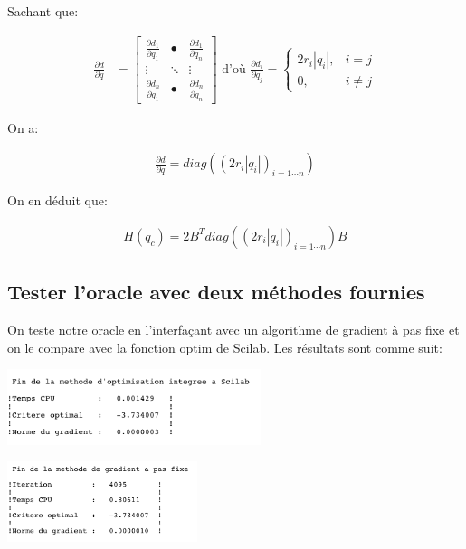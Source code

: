 Sachant que:

\vspace{-1.5em}
\begin{align*}
  \frac{\partial d}{\partial q} &=
  \begin{bmatrix}
    \frac{\partial d_1}{\partial q_1} & \bullet & \frac{\partial d_1}{\partial q_n} \\
    \vdots & \ddots & \vdots \\
    \frac{\partial d_n}{\partial q_1} & \bullet & \frac{\partial d_n}{\partial q_n}
  \end{bmatrix} \mbox{\ \ \ d'où \ \ } \frac{\partial d_i}{\partial q_j} =
  \begin{cases} 
    2r_i|q_i|,  & i = j \\
    0, & i \ne j
  \end{cases}
\end{align*}

On a:

\vspace{-1.5em}
\begin{align}
  \frac{\partial d}{\partial q} = diag((2r_i|q_i|)_{i=1 \cdots n})
\end{align}

On en déduit que:

\vspace{-1.5em}
\begin{align}
 H(q_c) = 2B^T diag((2r_i|q_i|)_{i=1 \cdots n}) B 
\end{align}

\subsection{Tester l'oracle avec deux méthodes fournies}

On teste notre oracle en l'interfaçant avec un algorithme de gradient à pas fixe et on le compare avec la fonction optim de Scilab. Les résultats sont comme suit:

\vspace{1em}

\begin{minipage}[t]{.5\textwidth}
    \includegraphics[width=20em]{pg_scilab.png}
\end{minipage}
\begin{minipage}[t]{.5\textwidth}
    \includegraphics[width=15em]{pg_fix.png}
\end{minipage}


